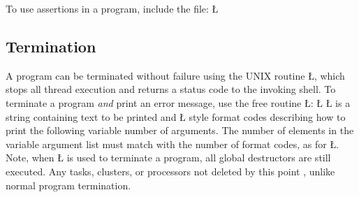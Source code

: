 \documentclass[openright,twoside]{report}
\begin{document}
To use assertions in a \uC program, include the file:
\LGinlinefalse\LGbegin\lgrinde
\L{}
\endlgrinde\LGend
{}%


\subsection{Termination}
\label{s:Termination}

A \uC program can be terminated without failure using the UNIX routine \LGinlinetrue\LGbegin\lgrinde\L{}\endlgrinde\LGend{}, which stops all thread execution and returns a status code to the invoking shell.
To terminate a program \emph{and} print an error message, use the \uC free routine \LGinlinetrue\LGbegin\lgrinde\L{}\endlgrinde\LGend{}:
\LGinlinefalse\LGbegin\lgrinde
\L{}
\endlgrinde\LGend
\LGinlinetrue\LGbegin\lgrinde\L{}\endlgrinde\LGend{} is a string containing text to be printed and \LGinlinetrue\LGbegin\lgrinde\L{}\endlgrinde\LGend{} style format codes describing how to print the following variable number of arguments.
The number of elements in the variable argument list must match with the number of format codes, as for \LGinlinetrue\LGbegin\lgrinde\L{}\endlgrinde\LGend{}.
Note, when \LGinlinetrue\LGbegin\lgrinde\L{}\endlgrinde\LGend{} is used to terminate a program, all global destructors are still executed.
Any tasks, clusters, or processors not deleted by this point , unlike normal program termination.
\end{document}
